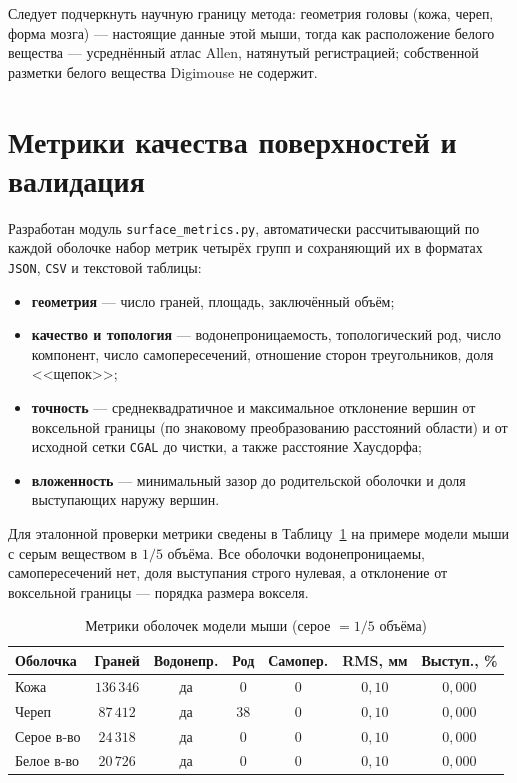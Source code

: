 \documentclass[a4paper,14pt]{article}
\begin{document}
Следует подчеркнуть научную границу метода: геометрия головы (кожа, череп, форма мозга) --- настоящие данные этой мыши, тогда как расположение белого вещества --- усреднённый атлас Allen, натянутый регистрацией; собственной разметки белого вещества Digimouse не содержит.

\newpage
\section{Метрики качества поверхностей и валидация}

Разработан модуль \texttt{surface\_metrics.py}, автоматически рассчитывающий по каждой оболочке набор метрик четырёх групп и сохраняющий их в форматах \texttt{JSON}, \texttt{CSV} и текстовой таблицы:
\begin{itemize}
    \item \textbf{геометрия} --- число граней, площадь, заключённый объём;
    \item \textbf{качество и топология} --- водонепроницаемость, топологический род, число компонент, число самопересечений, отношение сторон треугольников, доля <<щепок>>;
    \item \textbf{точность} --- среднеквадратичное и максимальное отклонение вершин от воксельной границы (по знаковому преобразованию расстояний области) и от исходной сетки \texttt{CGAL} до чистки, а также расстояние Хаусдорфа;
    \item \textbf{вложенность} --- минимальный зазор до родительской оболочки и доля выступающих наружу вершин.
\end{itemize}

Для эталонной проверки метрики сведены в Таблицу~\ref{tab:metrics} на примере модели мыши с серым веществом в $1/5$ объёма. Все оболочки водонепроницаемы, самопересечений нет, доля выступания строго нулевая, а отклонение от воксельной границы --- порядка размера вокселя.

\begin{table}[H]
\centering
\caption{Метрики оболочек модели мыши (серое $=1/5$ объёма)}
\label{tab:metrics}
\begin{tabular}{|l|c|c|c|c|c|c|}
\hline
\textbf{Оболочка} & \textbf{Граней} & \textbf{Водонепр.} & \textbf{Род} & \textbf{Самопер.} & \textbf{RMS, мм} & \textbf{Выступ., \%} \\ \hline
Кожа        & $136\,346$ & да & $0$  & $0$ & $0{,}10$ & $0{,}000$ \\ \hline
Череп       & $87\,412$  & да & $38$ & $0$ & $0{,}10$ & $0{,}000$ \\ \hline
Серое в-во  & $24\,318$  & да & $0$  & $0$ & $0{,}10$ & $0{,}000$ \\ \hline
Белое в-во  & $20\,726$  & да & $0$  & $0$ & $0{,}10$ & $0{,}000$ \\ \hline
\end{tabular}
\end{table}
\end{document}
